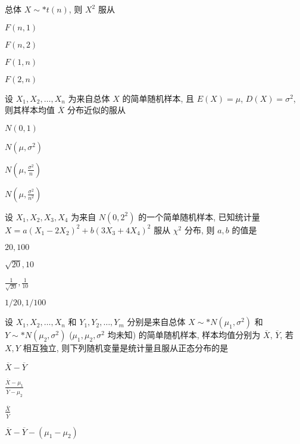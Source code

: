 \documentclass{exam-zh}
\begin{document}
\begin{question}
  总体 $X \sim* t(n)$, 则 $X^2$ 服从
  \paren[C]

  \begin{choices}
    \item $F(n, 1)$
    \item $F(n, 2)$
    \item $F(1, n)$
    \item $F(2, n)$
  \end{choices}
\end{question}

\begin{question}
  设 $X_1, X_2, \dots, X_n$ 为来自总体 $X$ 的简单随机样本, 且 $E(X) = \mu$, $D(X) = \sigma^2$, 则其样本均值 $\overline{X}$ 分布近似的服从
  \paren[C]

  \begin{choices}
    \item $N(0,1)$
    \item $N(\mu, \sigma^2)$
    \item $N(\mu, \frac{\sigma^2}{n})$
    \item $N(\mu, \frac{\sigma^2}{n^2})$
  \end{choices}
\end{question}

\begin{question}
  设 $X_1, X_2, X_3, X_4$ 为来自 $N(0, 2^2)$ 的一个简单随机样本, 已知统计量 $X = a(X_1 - 2X_2)^2 + b(3X_3 + 4X_4)^2$ 服从 $\chi^2$ 分布, 则 $a, b$ 的值是
  \paren[D]

  \begin{choices}
    \item $20, 100$
    \item $\sqrt{20}, 10$
    \item $\frac{1}{\sqrt{20}}, \frac{1}{10}$
    \item $1/20, 1/100$
  \end{choices}
\end{question}

\begin{question}
  设 $X_1, X_2, \dots, X_n$ 和 $Y_1, Y_2, \dots, Y_m$ 分别是来自总体 $X \sim* N(\mu_1, \sigma^2)$ 和 $Y \sim* N(\mu_2, \sigma^2)$ ($\mu_1, \mu_2, \sigma^2$ 均未知) 的简单随机样本, 样本均值分别为 $\overline{X}$, $\overline{Y}$, 若 $X, Y$ 相互独立, 则下列随机变量是统计量且服从正态分布的是
  \paren[A]

  \begin{choices}
    \item $\overline{X} - \overline{Y}$
    \item $\frac{\overline{X} - \mu_1}{\overline{Y} - \mu_2}$
    \item $\frac{\overline{X}}{\overline{Y}}$
    \item $\overline{X} - \overline{Y} - (\mu_1 - \mu_2)$
  \end{choices}
\end{question}
\end{document}
